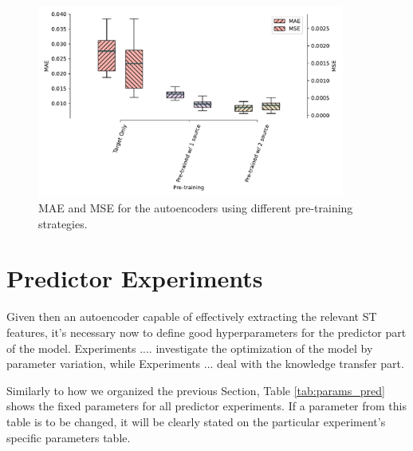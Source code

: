 \begin{figure}[!ht]
\noindent\hspace{0.5mm}\includegraphics[width=0.9\textwidth]{./figures/exp06/boxplot.pdf}
\caption{\gls{MAE} and \gls{MSE} for the autoencoders using different pre-training strategies.}
\label{fig:exp06boxplot}
\end{figure}


\section{Predictor Experiments}

Given then an autoencoder capable of effectively extracting the relevant \gls{ST} features, it's necessary now to define good hyperparameters for the predictor part of the model. Experiments .... investigate the optimization of the model by parameter variation, while Experiments ... deal with the knowledge transfer part.

Similarly to how we organized the previous Section, Table \ref{tab:params_pred} shows the fixed parameters for all predictor experiments. If a parameter from this table is to be changed, it will be clearly stated on the particular experiment's specific parameters table.

